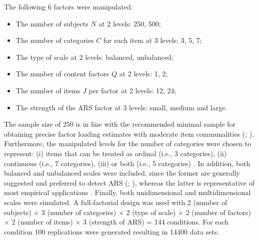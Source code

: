 \documentclass[a4paper,man,natbib]{apa6}
\begin{document}
\begin{linenumbers}
The following 6 factors were manipulated:
\begin{itemize}
	\item The number of subjects $N$ at 2 levels: 250, 500;
	\item The number of categories $C$ for each item at 3 levels: 3, 5, 7;
	\item The type of scale at 2 levels: balanced, unbalanced;
	\item The number of content factors $Q$ at 2 levels: 1, 2;
	\item The number of items $J$ per factor at 2 levels: 12, 24;
	\item The strength of the ARS factor at 3 levels: small, medium and large.
\end{itemize}

The sample size of 250 is in line with the recommended minimal sample for obtaining precise factor loading estimates with moderate item communalities (\citealp{fabrigar1999evaluating}; \citealp{maccallum1999sample}).	Furthermore, the manipulated levels for the number of categories were chosen to represent: (i) items that can be treated as ordinal (i.e., 3 categories), (ii) continuous (i.e., 7 categories), (iii) or both (i.e., 5 categories) \citep{rhemtulla2012can}. In addition, both balanced and unbalanced scales were included, since the former are generally suggested and preferred to detect ARS (\citealp{ferrando2010acquiescence};  \citealp{van2013response}), whereas the latter is representative of most empirical applications \citep{ferrando2010acquiescence}. Finally, both unidimensional and multidimensional scales were simulated. A full-factorial design was used with 2 (number of subjects) $\times$ 3 (number of categories) $\times$ 2 (type of scale) $\times$ 2 (number of factors) $\times$ 2 (number of items) $\times$ 3 (strength of ARS) = 144 conditions. For each condition 100 replications were generated resulting in 14400 data sets.




\end{linenumbers}
\end{document}

